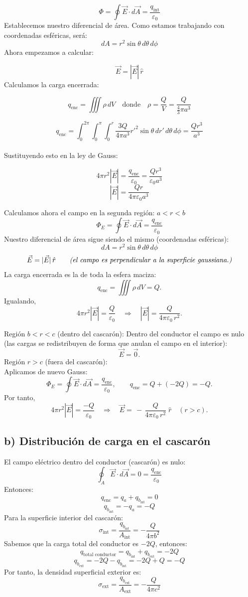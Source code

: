 \documentclass[a4paper,12pt]{article}
\begin{document}
\[
\Phi = \oint \vec E \cdot d\vec A = \frac{q_{\text{int}}}{\varepsilon_0}
\]
Establecemos nuestro diferencial de área. Como estamos trabajando con coordenadas esféricas, será:
\[
dA = r^2 \sin\theta\, d\theta\, d\phi
\]
Ahora empezamos a calcular:

\[
\vec E = |\vec E|\,\hat r
\]
Calculamos la carga encerrada:

\[
q_{\text{enc}} = \iiint \rho\, dV \quad \text{donde} \quad \rho = \frac{Q}{V} = \frac{Q}{\frac{4}{3}\pi a^3}
\]

\[
q_{\text{enc}} = \int_{0}^{2\pi}\!\!\int_{0}^{\pi}\!\!\int_{0}^{r} \frac{3Q}{4\pi a^3} r'^2 \sin\theta\, dr'\, d\theta\, d\phi 
= \frac{Q r^3}{a^3}
\]\\
Sustituyendo esto en la ley de Gauss:

\[
4\pi r^2 |\vec E| = \frac{q_{\text{enc}}}{\varepsilon_0} = \frac{Q r^3}{\varepsilon_0 a^3}
\]
\[
|\vec E| = \frac{Q r}{4\pi \varepsilon_0 a^3}
\]

\newpage
\noindent
Calculamos ahora el campo en la segunda región: \( a < r < b \)
\[
\Phi_E=\oint \vec E\cdot d\vec A=\frac{q_{\text{enc}}}{\varepsilon_0}
\]
Nuestro diferencial de área sigue siendo el mismo (coordenadas esféricas):
\[
dA=r^{2}\sin\theta\,d\theta\,d\phi
\]
\[
\vec{E} = |\vec{E}|\, \hat{r} 
\hfill
\qquad
\textit{(el campo es perpendicular a la superficie gaussiana.)}
\]
La carga encerrada es la de toda la esfera maciza:
\[
q_{\text{enc}}=\iiint \rho\,dV=Q.
\]
Igualando,
\[
4\pi r^{2}|\vec E|=\frac{Q}{\varepsilon_0}
\quad\Longrightarrow\quad
|\vec E|=\frac{Q}{4\pi\varepsilon_0\,r^{2}}.
\]

\medskip
\noindent
Región \(b<r<c\) (dentro del cascarón):
Dentro del conductor el campo es nulo (las cargas se redistribuyen de forma que
anulan el campo en el interior):
\[
\vec E=\vec 0.
\]
\noindent
Región \(r>c\) (fuera del cascarón):\\
Aplicamos de nuevo Gauss:
\[
\Phi_E=\oint \vec E\cdot d\vec A=\frac{q_{\text{enc}}}{\varepsilon_0},
\qquad
q_{\text{enc}}=Q+(-2Q)=-Q.
\]
Por tanto,
\[
4\pi r^{2}|\vec E|=\frac{-Q}{\varepsilon_0}
\quad\Longrightarrow\quad
\vec E=\,-\,\frac{Q}{4\pi\varepsilon_0\,r^{2}}\;\hat r
\quad (r>c).
\]
\subsection*{b) Distribución de carga en el cascarón}
\noindent
El campo eléctrico dentro del conductor (cascarón) es nulo:
\[
\oint_{A}\vec E\cdot d\vec A = 0 = \frac{q_{\text{enc}}}{\varepsilon_0}
\]
Entonces:
\[
q_{\text{enc}} = q_a + q_{b_{\text{int}}} = 0
\]
\[
q_{b_{\text{int}}} = -q_a = -Q
\]
Para la superficie interior del cascarón:
\[
\sigma_{\text{int}} = \frac{q_{b_{\text{int}}}}{A_{\text{int}}} = -\frac{Q}{4\pi b^{2}}
\]
Sabemos que la carga total del conductor es \(-2Q\), entonces:
\[
q_{\text{total conductor}} = q_{b_{\text{int}}} + q_{b_{\text{ext}}} = -2Q
\]
\[
q_{b_{\text{ext}}} = -2Q - q_{b_{\text{int}}} = -2Q + Q = -Q
\]
Por tanto, la densidad superficial exterior es:
\[
\sigma_{\text{ext}} = \frac{q_{b_{\text{ext}}}}{A_{\text{ext}}} = -\frac{Q}{4\pi c^{2}}
\]
\end{document}
